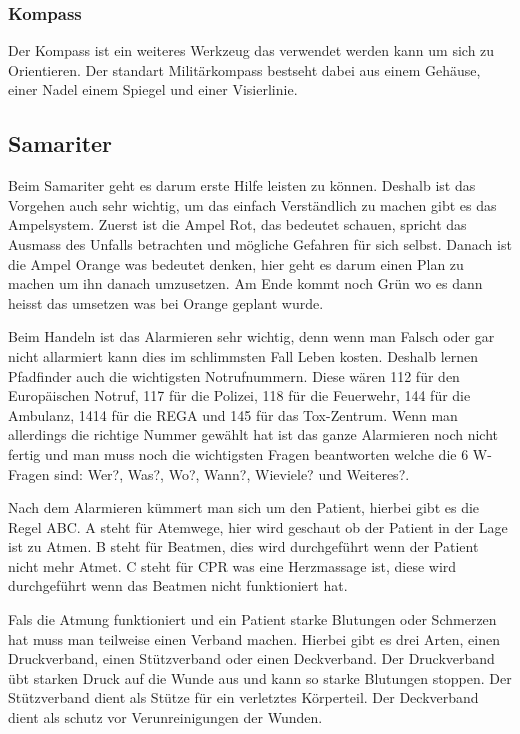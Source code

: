 \subsubsection{Kompass}
Der Kompass ist ein weiteres Werkzeug das verwendet werden kann um sich zu Orientieren. Der standart Militärkompass bestseht dabei aus einem Gehäuse, einer Nadel einem Spiegel und einer Visierlinie.

\subsection*{Samariter}
Beim Samariter geht es darum erste Hilfe leisten zu können. Deshalb ist das Vorgehen auch sehr wichtig, um das einfach Verständlich zu machen gibt es das Ampelsystem. Zuerst ist die Ampel Rot, das bedeutet schauen, spricht das Ausmass des Unfalls betrachten und mögliche Gefahren für sich selbst. Danach ist die Ampel Orange was bedeutet denken, hier geht es darum einen Plan zu machen um ihn danach umzusetzen. Am Ende kommt noch Grün wo es dann heisst das umsetzen was bei Orange geplant wurde. \par
Beim Handeln ist das Alarmieren sehr wichtig, denn wenn man Falsch oder gar nicht allarmiert kann dies im schlimmsten Fall Leben kosten. Deshalb lernen Pfadfinder auch die wichtigsten Notrufnummern. Diese wären 112 für den Europäischen Notruf, 117 für die Polizei, 118 für die Feuerwehr, 144 für die Ambulanz, 1414 für die REGA und 145 für das Tox-Zentrum. Wenn man allerdings die richtige Nummer gewählt hat ist das ganze Alarmieren noch nicht fertig und man muss noch die wichtigsten Fragen beantworten welche die 6 W-Fragen sind: Wer?, Was?, Wo?, Wann?, Wieviele? und Weiteres?. \par
Nach dem Alarmieren kümmert man sich um den Patient, hierbei gibt es die Regel ABC. A steht für Atemwege, hier wird geschaut ob der Patient in der Lage ist zu Atmen. B steht für Beatmen, dies wird durchgeführt wenn der Patient nicht mehr Atmet. C steht für CPR was eine Herzmassage ist, diese wird durchgeführt wenn das Beatmen nicht funktioniert hat. \par
Fals die Atmung funktioniert und ein Patient starke Blutungen oder Schmerzen hat muss man teilweise einen Verband machen. Hierbei gibt es drei Arten, einen Druckverband, einen Stützverband oder einen Deckverband. Der Druckverband übt starken Druck auf die Wunde aus und kann so starke Blutungen stoppen. Der Stützverband dient als Stütze für ein verletztes Körperteil. Der Deckverband dient als schutz vor Verunreinigungen der Wunden.

